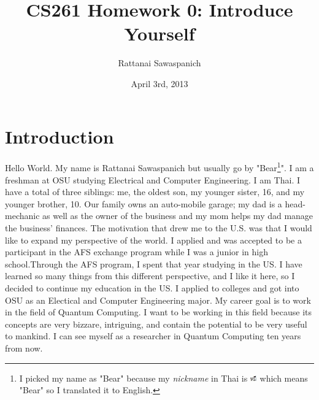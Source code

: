\documentclass{article}
\title{ CS261 Homework 0: Introduce Yourself}
\author{Rattanai Sawaspanich}
\date{April 3rd, 2013}
\begin{document}
 
\maketitle

\section{Introduction}
 \indent  Hello World.  My name is Rattanai Sawaspanich but usually go by "Bear\footnote{I picked my name as "Bear" because my \emph{nickname} in Thai is \includegraphics[width=0.115in]{./Bear_T.jpg} which means "Bear" so I translated it to English.}".  I am a freshman at OSU studying Electrical and Computer Engineering. I am Thai. I have a total of three siblings: me, the oldest son, my younger sister, 16, and my younger brother, 10.  Our family owns an auto-mobile garage; my dad is a head-mechanic as well as the owner of the business and my mom helps my dad manage the business' finances. 
\newline \indent  The motivation that drew me to the U.S. was that I would like to expand my perspective of the world. I applied and was accepted to be a participant in the AFS exchange program while I was a junior in high school.Through the AFS program, I spent that year studying in the US. I have learned so many things from this different perspective, and I like it here, so I decided to continue my education in the US.  I applied to colleges and got into OSU as an Electical and Computer Engineering major.  My career goal is to work in the field of Quantum Computing. I want to be working in this field because its concepts are very bizzare, intriguing, and contain the potential to be very useful to mankind.  I can see myself as a researcher in Quantum Computing ten years from now.
\end{document}
